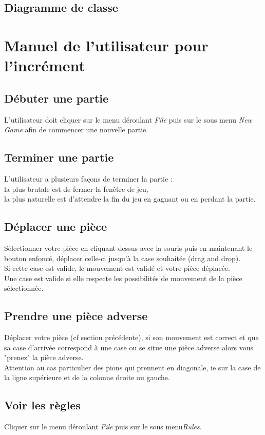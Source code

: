 \documentclass[12pt,a4paper]{report}
\begin{document}
\section*{Diagramme de classe}

\maketitle
\chapter*{Manuel de l'utilisateur pour l'incrément}

\section*{Débuter une partie}
L'utilisateur doit cliquer sur le menu déroulant {\it File} puis sur le sous menu {\it New Game} afin de commencer une nouvelle partie.
\section*{Terminer une partie}
L'utilisateur a plusieurs façons de terminer la partie :
\\la plus brutale est de fermer la fenêtre de jeu, 
\\ la plus naturelle est d'attendre la fin du jeu en gagnant ou en perdant la partie. 
\section*{Déplacer une pièce}
Sélectionner votre pièce en cliquant dessus avec la souris puis en maintenant le bouton enfoncé, déplacer celle-ci jusqu'à la case souhaitée (drag and drop).
\\Si cette case est valide, le mouvement est validé et votre pièce déplacée.
\\Une case est valide si elle respecte les possibilités de mouvement de la pièce sélectionnée.
\section*{Prendre une pièce adverse}
Déplacer votre pièce (cf section précédente), si son mouvement est correct et que sa case d'arrivée correspond à une case ou se situe une pièce adverse alors vous "prenez" la pièce adverse.
\\ Attention au cas particulier des pions qui prennent en diagonale, ie sur la case de la ligne supérieure et de la colonne droite ou gauche.
\section*{Voir les règles}
Cliquer sur le menu déroulant {\it File} puis sur le sous menu{\it Rules}.
\end{document}
